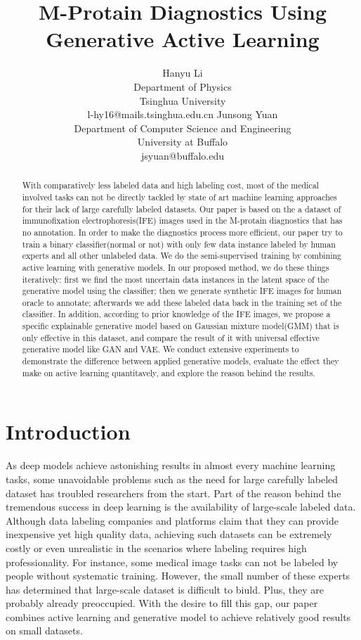\documentclass[letterpaper]{article}
\title{M-Protain Diagnostics Using Generative Active Learning}
\author{Hanyu Li\\
Department of Physics\\
Tsinghua University\\
l-hy16@mails.tsinghua.edu.cn
\And
Junsong Yuan\\
Department of Computer Science and Engineering\\
University at Buffalo\\
jsyuan@buffalo.edu}
\author{}
\begin{document}
\maketitle


\begin{abstract}
    With comparatively less labeled data and high labeling cost, most of the medical involved tasks can not be directly tackled by state of art machine learning approaches for their lack of large carefully labeled datasets. Our paper is based on the a dataset of immunofixation electrophoresis(IFE) images used in the M-protain diagnostics that has no annotation. In order to make the diagnostics process more efficient, our paper try to train a binary classifier(normal or not) with only few data instance labeled by human experts and all other unlabeled data. We do the semi-supervised training by combining active learning with generative models. In our proposed method, we do these things iteratively: first we find the most uncertain data instances in the latent space of the generative model using the classifier; then we generate synthetic IFE images for human oracle to annotate; afterwards we add these labeled data back in the training set of the classifier. In addition, according to prior knowledge of the IFE images, we propose a specific explainable generative model based on Gaussian mixture model(GMM) that is only effective in this dataset, and compare the result of it with universal effective generative model like GAN and VAE. We conduct extensive experiments to demonstrate the difference between applied generative models, evaluate the effect they make on active learning quantitavely, and explore the reason behind the results.
\end{abstract}


\section{Introduction}
\par As deep models achieve astonishing results in almost every machine learning tasks, some unavoidable problems such as the need for large carefully labeled dataset has troubled researchers from the start. Part of the reason behind the tremendous success in deep learning is the availability of large-scale labeled data\cite{sun2017revisiting}. Although data labeling companies and platforms claim that they can provide inexpensive yet high quality data\cite{buhrmester2011amazon}, achieving such datasets can be extremely costly or even unrealistic in the scenarios where labeling requires high professionality. For instance, some medical image tasks can not be labeled by people without systematic training. However, the small number of these experts has determined that large-scale dataset is difficult to biuld. Plus, they are probably already preoccupied. With the desire to fill this gap, our paper combines active learning and generative model to achieve relatively good results on small datasets.
\end{document}
